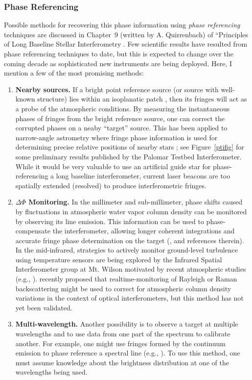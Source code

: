 \documentclass[12pt]{iopart}
\begin{document}
\subsubsection{Phase Referencing}
Possible methods for recovering this phase information using {\em
  phase referencing} techniques are discussed in Chapter~9 (written by
A. Quirrenbach) of ``Principles of Long Baseline Stellar
Interferometry \citep{mss2000}.  Few scientific results have resulted
from phase referencing techniques to date, but this is expected to
change over the coming decade as sophisticated new instruments are
being deployed.  Here, I mention a few of the most promising methods:

\begin{enumerate} 
\item{ {\bf Nearby sources.}  If a bright point reference source (or
    source with well-known structure) lies within an isoplanatic
    patch \citep[see][]{quirrenbach2000}, then its fringes will act as
    a probe of the atmospheric conditions.  By measuring the
    instantaneous phases of fringes from the bright reference source,
    one can correct the corrupted phases on a neaby ``target'' source.
    This has been applied to narrow-angle astrometry where fringe
    phase information is used for determining precise relative
    positions of nearby stars \citep{shao92,colavita99,lane2000a}; see
    Figure~\ref{ptifig} for some preliminary results published by the
    Palomar Testbed Interferometer.  While it would be very valuable
    to use an artificial guide star for phase-referencing a long
    baseline interferometer, current laser beacons are too spatially
    extended (resolved) to produce interferometric fringes.}
\item{{\bf $\Delta\Phi$ Monitoring.}  In the millimeter and
    sub-millimeter, phase shifts caused by fluctuations in atmospheric
    water vapor column density can be monitored by observing its line
    emission.  This information can be used to phase-compensate the
    interferometer, allowing longer coherent integrations and accurate
    fringe phase determination on the target (\citealt{wiedner98}, and
    references therein).  In the mid-infrared, strategies to actively
    monitor ground-level turbulence using temperature sensors are
    being explored by the Infrared Spatial Interferometer group
    \citep{short2002} at Mt. Wilson motivated by recent atmospheric
    studies (e.g., \citealt{bester92}).  \citet{townes2002} recently
    proposed that realtime-monitoring of Rayleigh or Raman
    backscattering might be used to correct for atmospheric column
    density variations in the context of optical interferometers, but
    this method has not yet been validated.  }
\item{{\bf Multi-wavelength.}  Another possibility is to observe a
    target at multiple wavelengths and to use data from one part of
    the spectrum to calibrate another.  For example, one might use
    fringes formed by the continuum emission to phase reference a
    spectral line (e.g., \citealt{gi2t97}).  To use this method, one
    must assume knowledge about the brightness distribution at one of
    the wavelengths being used.}
\end{enumerate}
\end{document}

